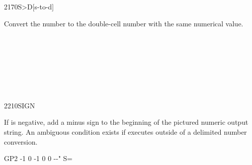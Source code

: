 \begin{worddef}[StoD]{2170}{S>D}[s-to-d]
\item {}

	Convert the number  to the double-cell number 
	with the same numerical value.

	\begin{testing} %
		 \\
		 \\
		 \\
		 \\
		 \\
		 \\
	\end{testing}
\end{worddef}


\begin{worddef}{2210}{SIGN}
\item {}

	If  is negative, add a minus sign to the beginning of
	the pictured numeric output string. An ambiguous condition exists
	if  executes outside of a  
	delimited number conversion.

	\begin{testing} %
		\ttfamily
		\word{:} GP2   -1  0  -1  0 0   -{}-" S= \word{;} \\
	\end{testing}
\end{worddef}


